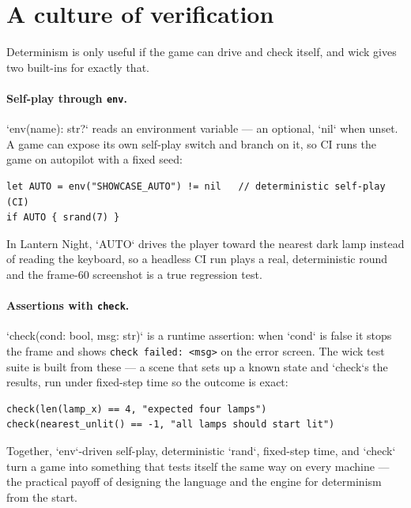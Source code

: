 \section{A culture of verification}

Determinism is only useful if the game can drive and check itself, and wick
gives two built-ins for exactly that.

\paragraph{Self-play through \texttt{env}.} `env(name): str?` reads an
environment variable --- an optional, `nil` when unset. A game can expose its
own self-play switch and branch on it, so CI runs the game on autopilot with a
fixed seed:

\begin{lstlisting}[language=wick]
let AUTO = env("SHOWCASE_AUTO") != nil   // deterministic self-play (CI)
if AUTO { srand(7) }
\end{lstlisting}

\noindent
In Lantern Night, `AUTO` drives the player toward the nearest dark lamp instead
of reading the keyboard, so a headless CI run plays a real, deterministic
round and the frame-60 screenshot is a true regression test.

\paragraph{Assertions with \texttt{check}.} `check(cond: bool, msg: str)` is a
runtime assertion: when `cond` is false it stops the frame and shows
\texttt{check failed: <msg>} on the error screen. The wick test suite is built
from these --- a scene that sets up a known state and `check`s the results,
run under fixed-step time so the outcome is exact:

\begin{lstlisting}[language=wick]
check(len(lamp_x) == 4, "expected four lamps")
check(nearest_unlit() == -1, "all lamps should start lit")
\end{lstlisting}

\noindent
Together, `env`-driven self-play, deterministic `rand`, fixed-step time, and
`check` turn a game into something that tests itself the same way on every
machine --- the practical payoff of designing the language and the engine for
determinism from the start.
